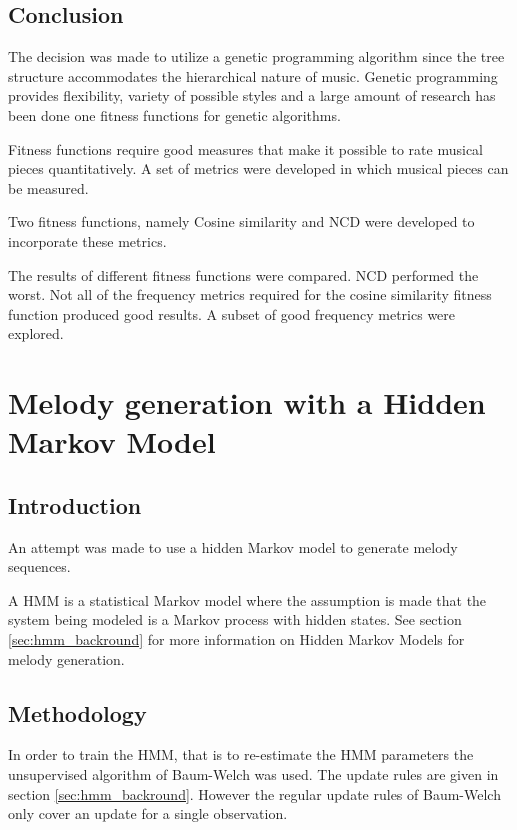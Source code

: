\section{Conclusion}

The decision was made to utilize a genetic programming algorithm since the tree structure accommodates the hierarchical nature of music. Genetic programming provides flexibility, variety of possible styles and a large amount of research has been done one fitness functions for genetic algorithms.

Fitness functions require good measures that make it possible to rate musical pieces quantitatively. A set of metrics were developed in which musical pieces can be measured.

Two fitness functions, namely Cosine similarity and \ac{NCD} were developed to incorporate these metrics.

The results of different fitness functions were compared. \ac{NCD} performed the worst. Not all of the frequency metrics required for the cosine similarity fitness function produced good results. A subset of good frequency metrics were explored.





\chapter{Melody generation with a Hidden Markov Model}
\section{Introduction}
An attempt was made to use a hidden Markov model to generate melody sequences.

A \ac{HMM} is a statistical Markov model where the assumption is made that the system being modeled  is a Markov process with hidden states. See section \ref{sec:hmm_backround} for more information on Hidden Markov Models for melody generation.

\section{Methodology}
In order to train the \ac{HMM}, that is to re-estimate the \ac{HMM} parameters the unsupervised algorithm of Baum-Welch was used. The update rules are given in section \ref{sec:hmm_backround}. However the regular update rules of Baum-Welch only cover an update for a single observation.

